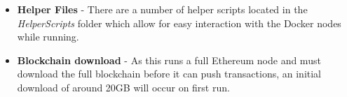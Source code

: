 \documentclass{article}
\begin{document}
\begin{itemize}

	\item \textbf{Helper Files} - There are a number of helper scripts located in the \textit{HelperScripts} folder which allow for easy interaction with the Docker nodes while running.
	
	\item \textbf{Blockchain download} - As this runs a full Ethereum node and must download the full blockchain before it can push transactions, an initial download of around 20GB will occur on first run.
\end{itemize}
\end{document}
